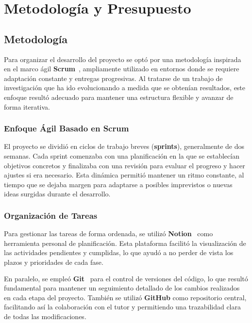 
\chapter{Metodología y Presupuesto}\label{ch:metodologia-y-presupuesto}
\section{Metodología}\label{sec:metodologia}
Para organizar el desarrollo del proyecto se optó por una metodología inspirada en el marco ágil
\textbf{Scrum}~\cite{noauthor_scrum_nodate}, ampliamente utilizado en entornos donde se requiere adaptación constante y
entregas progresivas.
Al tratarse de un trabajo de investigación que ha ido evolucionando a medida que se obtenían resultados, este enfoque
resultó adecuado para mantener una estructura flexible y avanzar de forma iterativa.

\subsection{Enfoque Ágil Basado en Scrum}\label{subsec:enfoque-agil-basado-en-scrum}
El proyecto se dividió en ciclos de trabajo breves (\textbf{sprints}), generalmente de dos semanas.
Cada sprint comenzaba con una planificación en la que se establecían objetivos concretos y finalizaba con una revisión
para evaluar el progreso y hacer ajustes si era necesario.
Esta dinámica permitió mantener un ritmo constante, al tiempo que se dejaba margen para adaptarse a posibles
imprevistos o nuevas ideas surgidas durante el desarrollo.

\subsection{Organización de Tareas}\label{subsec:organizacion-de-tareas}
Para gestionar las tareas de forma ordenada, se utilizó \textbf{Notion}~\cite{noauthor_notion_nodate} como herramienta
personal de planificación.
Esta plataforma facilitó la visualización de las actividades pendientes y cumplidas, lo que ayudó a no perder de vista
los plazos y prioridades de cada fase.


En paralelo, se empleó \textbf{Git}~\cite{chacon_pro_2014} para el control de versiones del código, lo que resultó
fundamental para mantener un seguimiento detallado de los cambios realizados en cada etapa del proyecto.
También se utilizó \textbf{GitHub} como repositorio central, facilitando así la colaboración con el tutor y permitiendo
una trazabilidad clara de todas las modificaciones.


